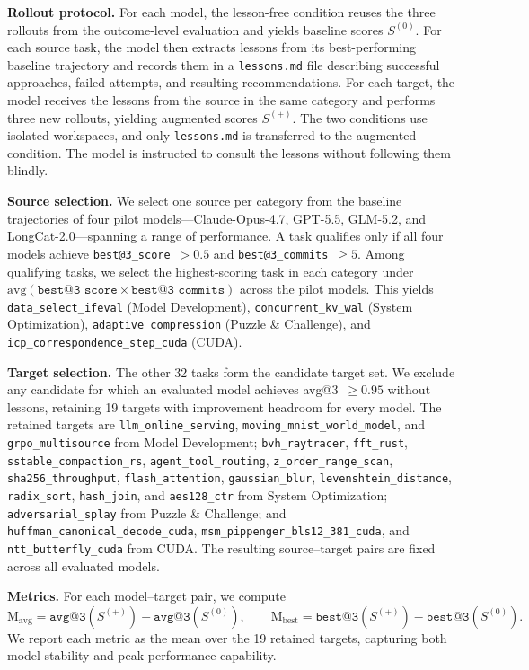 \textbf{Rollout protocol.}
For each model, the lesson-free condition reuses the three rollouts from the outcome-level evaluation and yields baseline scores $S^{(0)}$.
For each source task, the model then extracts lessons from its best-performing baseline trajectory and records them in a \texttt{lessons.md} file describing successful approaches, failed attempts, and resulting recommendations.
For each target, the model receives the lessons from the source in the same category and performs three new rollouts, yielding augmented scores $S^{(+)}$.
The two conditions use isolated workspaces, and only \texttt{lessons.md} is transferred to the augmented condition.
The model is instructed to consult the lessons without following them blindly.

\textbf{Source selection.}
We select one source per category from the baseline trajectories of four pilot models---Claude-Opus-4.7, GPT-5.5, GLM-5.2, and LongCat-2.0---spanning a range of performance.
A task qualifies only if all four models achieve \texttt{best@3\_score}~$>0.5$ and \texttt{best@3\_commits}~$\geq5$.
Among qualifying tasks, we select the highest-scoring task in each category under $\mathrm{avg}(\texttt{best@3\_score} \times \texttt{best@3\_commits})$ across the pilot models.
This yields \texttt{data\_select\_ifeval} (Model Development), \texttt{concurrent\_kv\_wal} (System Optimization), \texttt{adaptive\_compression} (Puzzle \& Challenge), and \texttt{icp\_correspondence\_step\_cuda} (CUDA).

\textbf{Target selection.}
The other 32 tasks form the candidate target set.
We exclude any candidate for which an evaluated model achieves avg@3~$\geq0.95$ without lessons, retaining 19 targets with improvement headroom for every model.
The retained targets are \texttt{llm\_online\_serving}, \texttt{moving\_mnist\_world\_model}, and \texttt{grpo\_multisource} from Model Development; \texttt{bvh\_raytracer}, \texttt{fft\_rust}, \texttt{sstable\_compaction\_rs}, \texttt{agent\_tool\_routing}, \texttt{z\_order\_range\_scan}, \texttt{sha256\_throughput}, \texttt{flash\_attention}, \texttt{gaussian\_blur}, \texttt{levenshtein\_distance}, \texttt{radix\_sort}, \texttt{hash\_join}, and \texttt{aes128\_ctr} from System Optimization; \texttt{adversarial\_splay} from Puzzle \& Challenge; and \texttt{huffman\_canonical\_decode\_cuda}, \texttt{msm\_pippenger\_bls12\_381\_cuda}, and \texttt{ntt\_butterfly\_cuda} from CUDA.
The resulting source--target pairs are fixed across all evaluated models.

\textbf{Metrics.}
For each model--target pair, we compute
\begin{equation}
\mathrm{M}_{\text{avg}} = \texttt{avg@3}(S^{(+)}) - \texttt{avg@3}(S^{(0)}), \qquad
\mathrm{M}_{\text{best}} = \texttt{best@3}(S^{(+)}) - \texttt{best@3}(S^{(0)}).
\end{equation}
We report each metric as the mean over the 19 retained targets, capturing both model stability and peak performance capability.



